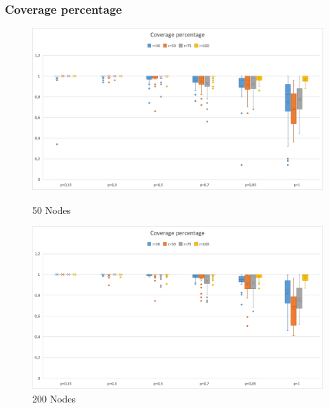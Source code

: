 \subsubsection{Coverage percentage}\label{subsec:CovPerc}
\begin{figure}[H]
  \includegraphics[width=\linewidth]{./images/Rate50Boxplot.png}
  \caption{50 Nodes}\label{fig:awesome_image1}
\endminipage\hfill
{}
  \includegraphics[width=\linewidth]{./images/Rate200Boxplot.png}
  \caption{200 Nodes}\label{fig:awesome_image2}
\endminipage
\end{figure}

